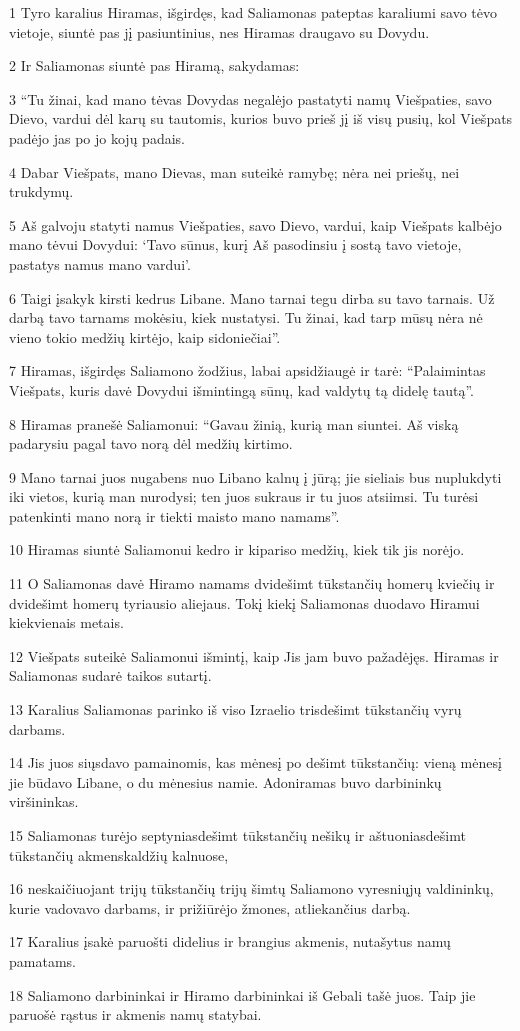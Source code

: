 \par 1 Tyro karalius Hiramas, išgirdęs, kad Saliamonas pateptas karaliumi savo tėvo vietoje, siuntė pas jį pasiuntinius, nes Hiramas draugavo su Dovydu. 
\par 2 Ir Saliamonas siuntė pas Hiramą, sakydamas: 
\par 3 “Tu žinai, kad mano tėvas Dovydas negalėjo pastatyti namų Viešpaties, savo Dievo, vardui dėl karų su tautomis, kurios buvo prieš jį iš visų pusių, kol Viešpats padėjo jas po jo kojų padais. 
\par 4 Dabar Viešpats, mano Dievas, man suteikė ramybę; nėra nei priešų, nei trukdymų. 
\par 5 Aš galvoju statyti namus Viešpaties, savo Dievo, vardui, kaip Viešpats kalbėjo mano tėvui Dovydui: ‘Tavo sūnus, kurį Aš pasodinsiu į sostą tavo vietoje, pastatys namus mano vardui’. 
\par 6 Taigi įsakyk kirsti kedrus Libane. Mano tarnai tegu dirba su tavo tarnais. Už darbą tavo tarnams mokėsiu, kiek nustatysi. Tu žinai, kad tarp mūsų nėra nė vieno tokio medžių kirtėjo, kaip sidoniečiai”. 
\par 7 Hiramas, išgirdęs Saliamono žodžius, labai apsidžiaugė ir tarė: “Palaimintas Viešpats, kuris davė Dovydui išmintingą sūnų, kad valdytų tą didelę tautą”. 
\par 8 Hiramas pranešė Saliamonui: “Gavau žinią, kurią man siuntei. Aš viską padarysiu pagal tavo norą dėl medžių kirtimo. 
\par 9 Mano tarnai juos nugabens nuo Libano kalnų į jūrą; jie sieliais bus nuplukdyti iki vietos, kurią man nurodysi; ten juos sukraus ir tu juos atsiimsi. Tu turėsi patenkinti mano norą ir tiekti maisto mano namams”. 
\par 10 Hiramas siuntė Saliamonui kedro ir kipariso medžių, kiek tik jis norėjo. 
\par 11 O Saliamonas davė Hiramo namams dvidešimt tūkstančių homerų kviečių ir dvidešimt homerų tyriausio aliejaus. Tokį kiekį Saliamonas duodavo Hiramui kiekvienais metais. 
\par 12 Viešpats suteikė Saliamonui išmintį, kaip Jis jam buvo pažadėjęs. Hiramas ir Saliamonas sudarė taikos sutartį. 
\par 13 Karalius Saliamonas parinko iš viso Izraelio trisdešimt tūkstančių vyrų darbams. 
\par 14 Jis juos siųsdavo pamainomis, kas mėnesį po dešimt tūkstančių: vieną mėnesį jie būdavo Libane, o du mėnesius namie. Adoniramas buvo darbininkų viršininkas. 
\par 15 Saliamonas turėjo septyniasdešimt tūkstančių nešikų ir aštuoniasdešimt tūkstančių akmenskaldžių kalnuose, 
\par 16 neskaičiuojant trijų tūkstančių trijų šimtų Saliamono vyresniųjų valdininkų, kurie vadovavo darbams, ir prižiūrėjo žmones, atliekančius darbą. 
\par 17 Karalius įsakė paruošti didelius ir brangius akmenis, nutašytus namų pamatams. 
\par 18 Saliamono darbininkai ir Hiramo darbininkai iš Gebali tašė juos. Taip jie paruošė rąstus ir akmenis namų statybai.



